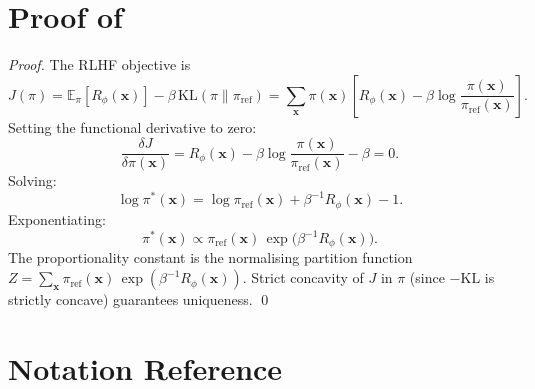 \documentclass[11pt,a4paper]{article}
\theoremstyle{plain}
\theoremstyle{definition}
\theoremstyle{remark}
\newcommand{\E}{\mathbb{E}}
\newcommand{\KL}{\mathrm{KL}}
\begin{document}
\section{Proof of }\label{app:rlhf_proof}

\begin{proof}
The RLHF objective is
\[
  J(\pi) = \E_\pi[R_\phi(\bm{x})] - \beta\, \KL(\pi \| \pi_{\mathrm{ref}})
  = \sum_{\bm{x}} \pi(\bm{x})\!\left[
    R_\phi(\bm{x}) - \beta \log \frac{\pi(\bm{x})}{\pi_{\mathrm{ref}}(\bm{x})}
  \right].
\]
Setting the functional derivative to zero:
\[
  \frac{\delta J}{\delta \pi(\bm{x})}
  = R_\phi(\bm{x}) - \beta \log \frac{\pi(\bm{x})}{\pi_{\mathrm{ref}}(\bm{x})} - \beta
  = 0.
\]
Solving:
\[
  \log \pi^*(\bm{x})
  = \log \pi_{\mathrm{ref}}(\bm{x}) + \beta^{-1} R_\phi(\bm{x}) - 1.
\]
Exponentiating:
\[
  \pi^*(\bm{x}) \propto \pi_{\mathrm{ref}}(\bm{x})\, \exp\!\bigl(\beta^{-1} R_\phi(\bm{x})\bigr).
\]
The proportionality constant is the normalising partition function
$Z = \sum_{\bm{x}} \pi_{\mathrm{ref}}(\bm{x})\, \exp(\beta^{-1} R_\phi(\bm{x}))$.
Strict concavity of $J$ in $\pi$ (since $-\KL$ is strictly concave)
guarantees uniqueness. \qed
\end{proof}


\section{Notation Reference}\label{app:notation}
\end{document}

